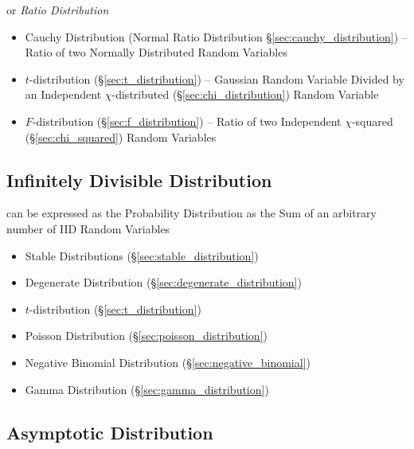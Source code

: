 or \emph{Ratio Distribution}

\begin{itemize}
  \item Cauchy Distribution (Normal Ratio Distribution
    \S\ref{sec:cauchy_distribution}) -- Ratio of two Normally Distributed Random
    Variables
  \item $t$-distribution (\S\ref{sec:t_distribution}) -- Gaussian Random
    Variable Divided by an Independent $\chi$-distributed
    (\S\ref{sec:chi_distribution}) Random Variable
  \item $F$-distribution (\S\ref{sec:f_distribution}) -- Ratio of two
    Independent $\chi$-squared (\S\ref{sec:chi_squared}) Random Variables
\end{itemize}



\subsection{Infinitely Divisible Distribution}
\label{sec:infinitely_divisible}

can be expressed as the Probability Distribution as the Sum of an arbitrary
number of IID Random Variables

\begin{itemize}
  \item Stable Distributions (\S\ref{sec:stable_distribution})
  \item Degenerate Distribution (\S\ref{sec:degenerate_distribution})
  \item $t$-distribution (\S\ref{sec:t_distribution})
  \item Poisson Distribution (\S\ref{sec:poisson_distribution})
  \item Negative Binomial Distribution (\S\ref{sec:negative_binomial})
  \item Gamma Distribution (\S\ref{sec:gamma_distribution})
\end{itemize}



\subsection{Asymptotic Distribution}\label{sec:asymptotic_distribution}

